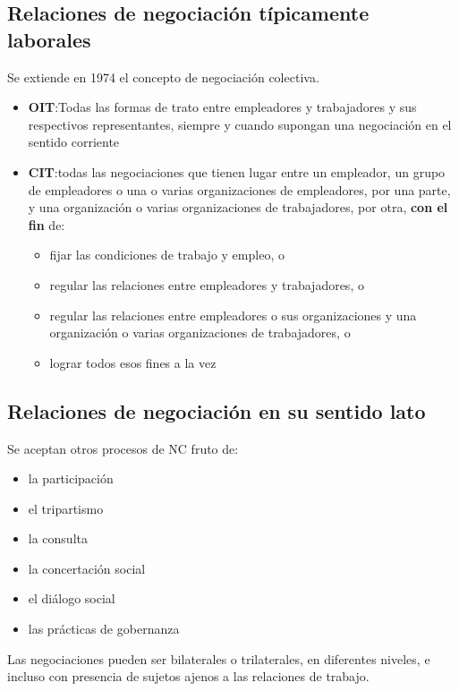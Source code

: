 \documentclass[spanish,12pt,a4paper,titlepage]{report}
\begin{document}
\subsection{Relaciones de negociación típicamente laborales}
Se extiende en 1974 el concepto de negociación colectiva.
\begin{itemize}
	\item \textbf{OIT}:Todas las formas de trato entre empleadores y trabajadores y sus respectivos representantes, siempre y cuando supongan una negociación en el sentido corriente
	\item \textbf{CIT}:todas las 
	negociaciones que tienen lugar entre un empleador, un grupo de empleadores o una o varias organizaciones de empleadores, por una parte, y una organización o varias organizaciones de trabajadores, por otra, \textbf{con el fin} de:
	\begin{itemize}
		\item fijar las condiciones de trabajo y empleo, o
		\item regular las relaciones entre empleadores y trabajadores, o
		\item regular las relaciones entre empleadores o sus organizaciones y una organización o varias organizaciones de trabajadores, o
		\item lograr todos esos fines a la vez
	\end{itemize}
\end{itemize}

\subsection{Relaciones de negociación en su sentido lato}
Se aceptan otros procesos de NC fruto de:
\begin{itemize}
	\item la participación
	\item el tripartismo
	\item la consulta
	\item la concertación social
	\item el diálogo social
	\item las prácticas de gobernanza
\end{itemize}
Las negociaciones pueden ser bilaterales o trilaterales, en diferentes niveles, e incluso con presencia de sujetos ajenos a las relaciones de trabajo.\\
\end{document}
